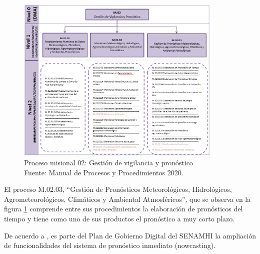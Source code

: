 \begin{figure}[H]
  \centering
  \includegraphics[height=8cm]{E_IMAGENES/2_MarcoTeorico/PM02}
  \caption{
    Proceso misional 02: Gestión de vigilancia y pronóstico\\
    Fuente: Manual de Procesos y Procedimientos 2020.
  }
  \label{fig:pm02}
\end{figure}

El proceso M.02.03, ``Gestión de Pronósticos Meteorológicos, Hidrológicos, 
Agrometeorológicos, Climáticos y Ambiental Atmosféricos'', que se observa en la 
figura \ref{fig:pm02} comprende entre sus procedimientos la elaboración de 
pronósticos del tiempo y tiene como uno de sus productos el pronóstico a muy 
corto plazo. 

De acuerdo a \cite{senamhi2021govdig}, es parte del Plan de Gobierno Digital del 
SENAMHI la ampliación de funcionalidades del sistema de pronóstico inmediato 
(nowcasting).
